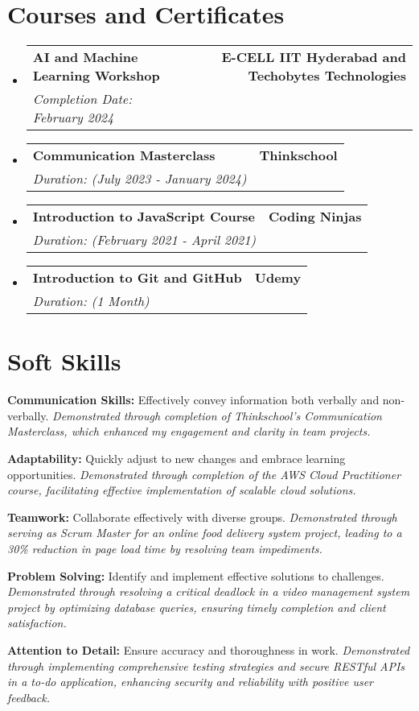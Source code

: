 \documentclass[letterpaper,11pt]{article}
\makeatletter
\newcommand{\resumeSubheading}[4]{
  \vspace{-2pt}\item
    \begin{tabular*}{1.0\textwidth}[t]{l@{\extracolsep{\fill}}r}
      \textbf{#1} & \textbf{\small #2} \\
      \textit{\small#3} & \textit{\small #4} \\
    \end{tabular*}\vspace{-7pt}
}
\newcommand{\resumeSubHeadingListStart}{\begin{itemize}[leftmargin=0.0in, label={}]}
\newcommand{\resumeSubHeadingListEnd}{\end{itemize}}
\makeatother
\begin{document}
\section{Courses and Certificates}
    \resumeSubHeadingListStart
        \resumeSubheading
            {AI and Machine Learning Workshop}{E-CELL IIT Hyderabad and Techobytes Technologies}
            {Completion Date: February 2024}{}
        \resumeSubheading
            {Communication Masterclass}{Thinkschool}
            {Duration: (July 2023 - January 2024)}{}
        \resumeSubheading
            {Introduction to JavaScript Course}{Coding Ninjas}
            {Duration: (February 2021 - April 2021)}{}
        \resumeSubheading
            {Introduction to Git and GitHub}{Udemy}
            {Duration: (1 Month)}{}
    \resumeSubHeadingListEnd

    \section{Soft Skills}
\begin{itemize}[leftmargin=0.15in, label={}]
    \small{
      \item{\textbf{Communication Skills:} Effectively convey information both verbally and non-verbally. \textit{Demonstrated through completion of Thinkschool’s Communication Masterclass, which enhanced my engagement and clarity in team projects.}}
      
      \item{\textbf{Adaptability:} Quickly adjust to new changes and embrace learning opportunities. \textit{Demonstrated through completion of the AWS Cloud Practitioner course, facilitating effective implementation of scalable cloud solutions.}}
      
      \item{\textbf{Teamwork:} Collaborate effectively with diverse groups. \textit{Demonstrated through serving as Scrum Master for an online food delivery system project, leading to a 30\% reduction in page load time by resolving team impediments.}}
      
      \item{\textbf{Problem Solving:} Identify and implement effective solutions to challenges. \textit{Demonstrated through resolving a critical deadlock in a video management system project by optimizing database queries, ensuring timely completion and client satisfaction.}}
      
      \item{\textbf{Attention to Detail:} Ensure accuracy and thoroughness in work. \textit{Demonstrated through implementing comprehensive testing strategies and secure RESTful APIs in a to-do application, enhancing security and reliability with positive user feedback.}}
    }
\end{itemize}
\end{document}

